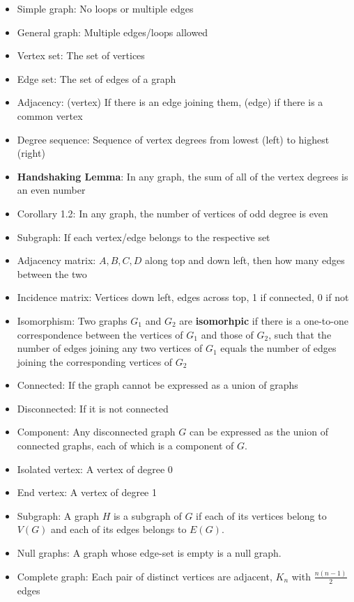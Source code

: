 \documentclass[10pt,landscape]{article}
\begin{document}
\begin{multicols}{2}
\begin{itemize}
    \item Simple graph: No loops or multiple edges
    \item General graph: Multiple edges/loops allowed
    \item Vertex set: The set of vertices
    \item Edge set: The set of edges of a graph
    \item Adjacency: (vertex) If there is an edge joining them, (edge) if there is a common vertex
    \item Degree sequence: Sequence of vertex degrees from lowest (left) to highest (right)
    \item \textbf{Handshaking Lemma}: In any graph, the sum of all of the vertex degrees is an even number
    \item Corollary 1.2: In any graph, the number of vertices of odd degree is even
    \item Subgraph: If each vertex/edge belongs to the respective set
    \item Adjacency matrix: $A, B, C, D$ along top and down left, then how many edges between the two
    \item Incidence matrix: Vertices down left, edges across top, 1 if connected, 0 if not
    \item Isomorphism: Two graphs $G_1$ and $G_2$ are \textbf{isomorhpic} if there is a one-to-one correspondence between the vertices of $G_1$ and those of $G_2$, such that the number of edges joining any two vertices of $G_1$ equals the number of edges joining the corresponding vertices of $G_2$
    \item Connected: If the graph cannot be expressed as a union of graphs
    \item Disconnected: If it is not connected
    \item Component: Any disconnected graph $G$ can be expressed as the union of connected graphs, each of which is a component of $G$.
    \item Isolated vertex: A vertex of degree 0
    \item End vertex: A vertex of degree 1
    \item Subgraph: A graph $H$ is a subgraph of $G$ if each of its vertices belong to $V(G)$ and each of its edges belongs to $E(G)$.
    \item Null graphs: A graph whose edge-set is empty is a null graph.
    \item Complete graph: Each pair of distinct vertices are adjacent, $K_n$ with $\frac{n(n-1)}{2}$ edges

\end{itemize}
\end{multicols}
\end{document}
